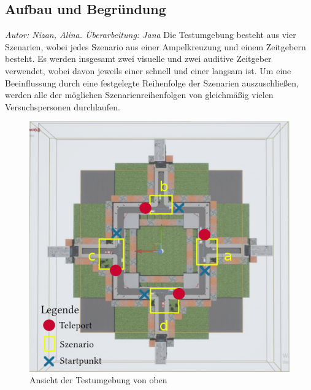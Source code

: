 \documentclass{Paper}
\begin{document}


\subsection{Aufbau und Begründung}
\label{aufbau}
       \textit{Autor: Nizan, Alina. Überarbeitung: Jana}
Die Testumgebung besteht aus vier Szenarien, wobei jedes Szenario aus einer Ampelkreuzung und einem Zeitgebern besteht. Es werden insgesamt zwei visuelle und zwei auditive Zeitgeber verwendet, wobei davon jeweils einer schnell und einer langsam ist.
Um eine Beeinflussung durch eine festgelegte Reihenfolge der Szenarien auszuschließen, werden alle der möglichen Szenarienreihenfolgen von gleichmäßig vielen Versuchspersonen durchlaufen.

\begin{figure}[H]
	\centering
	\includegraphics[scale=0.7]{../Bilder/mapLegende.png}
	\caption{Ansicht der Testumgebung von oben}
	\label{img:map}
\end{figure}
\end{document}

